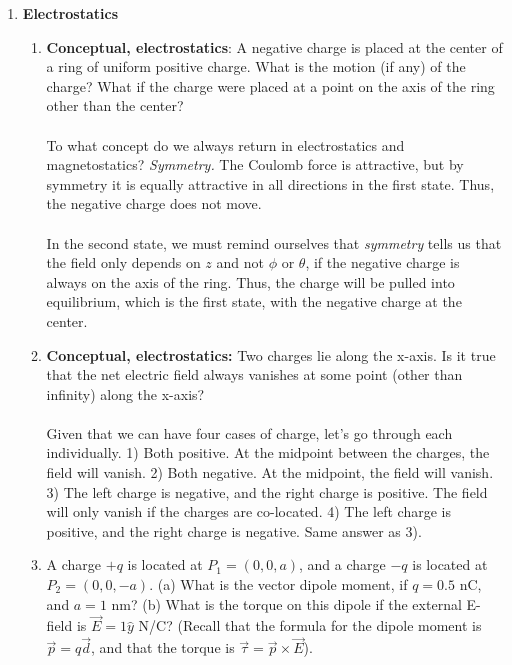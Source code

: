 \documentclass[10pt]{article}
\begin{document}
\maketitle

\begin{enumerate}
\item \textbf{Electrostatics}
\begin{enumerate}
\item \textbf{Conceptual, electrostatics}: A negative charge is placed at the center of a ring of uniform positive charge. What is the motion (if any) of the
charge? What if the charge were placed at a point on the axis of the ring other than the center? \\ \\ 
To what concept do we always return in electrostatics and magnetostatics? \textit{Symmetry.}  The Coulomb force is attractive, but by symmetry it is equally attractive in all directions in the first state. Thus, the negative charge does not move. \\ \\
In the second state, we must remind ourselves that \textit{symmetry} tells us that the field only depends on $z$ and not $\phi$ or $\theta$, if the negative charge is always on the axis of the ring.  Thus, the charge will be pulled into equilibrium, which is the first state, with the negative charge at the center.
\item \textbf{Conceptual, electrostatics:} Two charges lie along the x-axis. Is it true that the net electric field always vanishes at some point (other than infinity) along the x-axis? \\ \\ 
Given that we can have four cases of charge, let's go through each individually.  1) Both positive.  At the midpoint between the charges, the field will vanish.  2) Both negative.  At the midpoint, the field will vanish.  3) The left charge is negative, and the right charge is positive.  The field will only vanish if the charges are co-located.  4) The left charge is positive, and the right charge is negative.  Same answer as 3).
\item A charge $+q$ is located at $P_1 = (0,0,a)$, and a charge $-q$ is located at $P_2 = (0,0,-a)$.  (a) What is the vector dipole moment, if $q = 0.5$ nC, and $a = 1$ nm?  (b) What is the torque on this dipole if the external E-field is $\vec{E} = 1 \hat{y}$ N/C? (Recall that the formula for the dipole moment is $\vec{p} = q \vec{d}$, and that the torque is $\vec{\tau} = \vec{p} \times \vec{E}$).  \\ \\

\end{enumerate}
\end{enumerate}
\end{document}
